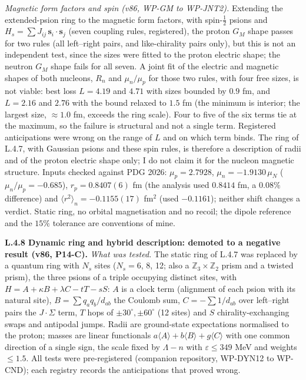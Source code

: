 \documentclass[11pt,letterpaper]{article}
\begin{document}
\noindent \emph{Magnetic form factors and spin (v86, WP-GM to WP-JNT2).} Extending the extended-psion ring to the magnetic form factors, with spin-$\tfrac12$ psions and $H_s=\sum J_{ij}\,\mathbf s_i\!\cdot\!\mathbf s_j$ (seven coupling rules, registered), the proton $G_M$ shape passes for two rules (all left--right pairs, and like-chirality pairs only), but this is not an independent test, since the sizes were fitted to the proton electric shape; the neutron $G_M$ shape fails for all seven. A joint fit of the electric and magnetic shapes of both nucleons, $R_n$ and $\mu_n/\mu_p$ for those two rules, with four free sizes, is not viable: best loss $L=4.19$ and $4.71$ with sizes bounded by $0.9$ fm, and $L=2.16$ and $2.76$ with the bound relaxed to $1.5$ fm (the minimum is interior; the largest size, $\approx1.0$ fm, exceeds the ring scale). Four to five of the six terms tie at the maximum, so the failure is structural and not a single term. Registered anticipations were wrong on the range of $L$ and on which term binds. The ring of L.4.7, with Gaussian psions and these spin rules, is therefore a description of radii and of the proton electric shape only; I do not claim it for the nucleon magnetic structure. Inputs checked against PDG 2026: $\mu_p=2.7928$, $\mu_n=-1.9130\,\mu_N$ ($\mu_n/\mu_p=-0.685$), $r_p=0.8407(6)$ fm (the analysis used $0.8414$ fm, a $0.08\%$ difference) and $\langle r^2\rangle_n=-0.1155(17)$ fm$^2$ (used $-0.1161$); neither shift changes a verdict. Static ring, no orbital magnetisation and no recoil; the dipole reference and the $15\%$ tolerance are conventions of mine.

\noindent \textbf{L.4.8 Dynamic ring and hybrid description: demoted to a negative result (v86, P14-C).} \emph{What was tested.} The static ring of L.4.7 was replaced by a quantum ring with $N_s$ sites ($N_s=6$, 8, 12; also a $\mathbb{Z}_3\times\mathbb{Z}_2$ prism and a twisted prism), the three psions of a triple occupying distinct sites, with $H=A+\kappa B+\lambda C-tT-sS$: $A$ is a clock term (alignment of each psion with its natural site), $B=\sum q_aq_b/d_{ab}$ the Coulomb sum, $C=-\sum1/d_{ab}$ over left--right pairs the $J\!\cdot\!\Sigma$ term, $T$ hops of $\pm30^\circ,\pm60^\circ$ (12 sites) and $S$ chirality-exchanging swaps and antipodal jumps. Radii are ground-state expectations normalised to the proton; masses are linear functionals $a\langle A\rangle+b\langle B\rangle+g\langle C\rangle$ with one common direction of a single sign, the scale fixed by $\Lambda-n$ with $\varepsilon\le349$ MeV and weights $\le1.5$. All tests were pre-registered (companion repository, WP-DYN12 to WP-CND); each registry records the anticipations that proved wrong.
\end{document}
